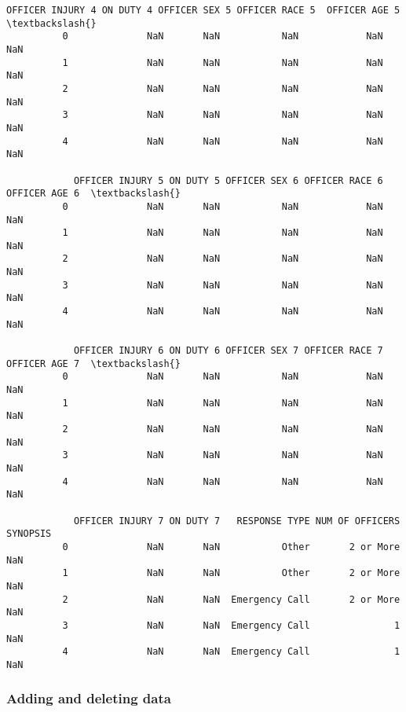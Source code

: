 \documentclass[11pt]{article}
\begin{document}
\begin{Verbatim}[commandchars=\\\{\}]
            OFFICER INJURY 4 ON DUTY 4 OFFICER SEX 5 OFFICER RACE 5  OFFICER AGE 5  \textbackslash{}
          0              NaN       NaN           NaN            NaN            NaN   
          1              NaN       NaN           NaN            NaN            NaN   
          2              NaN       NaN           NaN            NaN            NaN   
          3              NaN       NaN           NaN            NaN            NaN   
          4              NaN       NaN           NaN            NaN            NaN   
          
            OFFICER INJURY 5 ON DUTY 5 OFFICER SEX 6 OFFICER RACE 6  OFFICER AGE 6  \textbackslash{}
          0              NaN       NaN           NaN            NaN            NaN   
          1              NaN       NaN           NaN            NaN            NaN   
          2              NaN       NaN           NaN            NaN            NaN   
          3              NaN       NaN           NaN            NaN            NaN   
          4              NaN       NaN           NaN            NaN            NaN   
          
            OFFICER INJURY 6 ON DUTY 6 OFFICER SEX 7 OFFICER RACE 7  OFFICER AGE 7  \textbackslash{}
          0              NaN       NaN           NaN            NaN            NaN   
          1              NaN       NaN           NaN            NaN            NaN   
          2              NaN       NaN           NaN            NaN            NaN   
          3              NaN       NaN           NaN            NaN            NaN   
          4              NaN       NaN           NaN            NaN            NaN   
          
            OFFICER INJURY 7 ON DUTY 7   RESPONSE TYPE NUM OF OFFICERS SYNOPSIS  
          0              NaN       NaN           Other       2 or More      NaN  
          1              NaN       NaN           Other       2 or More      NaN  
          2              NaN       NaN  Emergency Call       2 or More      NaN  
          3              NaN       NaN  Emergency Call               1      NaN  
          4              NaN       NaN  Emergency Call               1      NaN  
\end{Verbatim}
            
    \subsubsection{Adding and deleting data}\label{adding-and-deleting-data}
\end{document}
